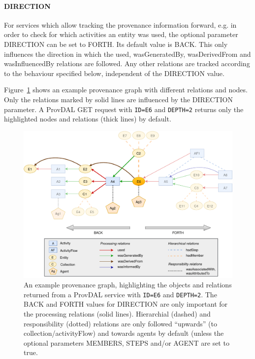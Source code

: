 \paragraph{DIRECTION}
For services which allow tracking the provenance information forward, e.g. in order to check for which activities an entity was used, the optional parameter DIRECTION can be set to FORTH. Its default value is BACK. This only influences the direction in which the used, wasGeneratedBy, wasDerivedFrom and wasInfluencedBy relations are followed. Any other relations are tracked according to the behaviour specified below, independent of the DIRECTION value.


Figure~\ref{fig:provenance-graph-example} shows an example provenance graph with different relations and nodes. Only the relations marked by solid lines are influenced by the DIRECTION parameter. A ProvDAL GET request with \texttt{ID=E6} and \texttt{DEPTH=2} returns only the highlighted nodes and relations (thick lines) by default.

\begin{figure}[h]
\centering
\includegraphics[width=1.0\textwidth]{provenance-graph-example-depth2.pdf}
\caption{An example provenance graph, highlighting the objects and relations returned from a ProvDAL service with \texttt{ID=E6} and \texttt{DEPTH=2}. The BACK and FORTH values for DIRECTION are only important for the processing relations (solid lines). Hierarchial (dashed) and responsibility (dotted) relations are only followed ``upwards'' (to collection/activityFlow) and towards agents by default (unless the optional parameters MEMBERS, STEPS and/or AGENT are set to true.}
\label{fig:provenance-graph-example}
\end{figure}




